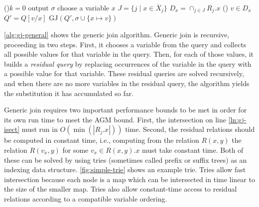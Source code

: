 \begin{algorithm}
  \LinesNumbered{} \SetAlgoLined{}
  \eIf(){$k=0$}
    {output $\sigma$}
    {
      choose a variable $x$\;
      $J = \{j \mid x \in \overline{X}_j\}$\;
      $D_x = \cap_{j \in J} R_j.x$\label{ln:gj-isect}\;
      \For()
      {$v \in D_x$}
      {
        $Q' = Q[v/x]$\;
        GJ$(Q', \sigma \cup \{ x \mapsto v \})$
      }
    }
  \caption{
    Generic join for the general query
    $Q(x_1,\ldots,x_k) \gets R_1(\overline{X}_1),\ldots,R_n(\overline{X}_n)$
  }\label{alg:gj-general}
\end{algorithm}

\autoref{alg:gj-general} shows the generic join algorithm.
Generic join is recursive,
 proceeding in two steps.
First,
 it chooses a variable from the query and
 collects all possible values for that variable in the query.
Then,
 for each of those values,
 it builds a \textit{residual query}
 by replacing occurrences of the variable in the query with a possible
 value for that variable.
These residual queries are solved recursively,
 and when there are no more variables in the residual query,
 the algorithm yields the substitution it has accumulated so far.

Generic join
 requires two important performance
 bounds to be met in order for its own run time to meet the AGM bound.
First, the intersection on line \ref{ln:gj-isect}
 must run in $O(\min(|R_j.x|))$ time.
Second,
 the residual relations
 should be computed in constant time,
 i.e., computing from the relation $R(x, y)$
 the relation $R(v_x, y)$ for some $v_x \in R(x, y).x$
 must take constant time.
Both of these
 can be solved by using tries
 (sometimes called prefix or suffix trees)
 as an indexing data structure.
\autoref{fig:simple-trie} shows an example trie.
Tries allow fast
 intersection because
 each node is a map which
 can be intersected in time linear to the size of the smaller map.
Tries also allow constant-time access
 to residual relations according to a compatible variable ordering.

